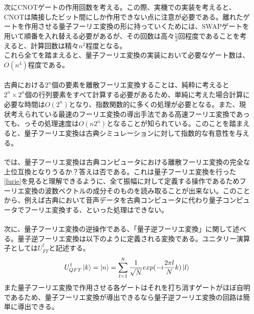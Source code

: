\documentclass[a4paper,10.5pt]{article}
\numberwithin{equation}{section}
\begin{document}
次にCNOTゲートの作用回数を考える。この際、実機での実装を考えると、CNOTは隣接したビット間にしか作用できない点に注意が必要である。離れたゲートを作用させる量子フーリエ変換の形に持っていくためには、SWAPゲートを用いて順番を入れ替える必要があるが、その回数は高々$\frac{n}{2}$回程度であることを考えると、計算回数は精々$n^{2}$程度となる。\\
これら全てを踏まえると、量子フーリエ変換の実装において必要なゲート数は、$O(n^{4})$程度である。\\
\\
古典における$2^{n}$個の要素を離散フーリエ変換することは、純粋に考えると$2^{n}\times2^{n}$個の行列要素をすべて計算する必要があるため、単純に考えた場合計算に必要な時間は$O(2^{n})$となり、指数関数的に多くの処理が必要となる。また、現状考えられている最速のフーリエ変換の導出手法である高速フーリエ変換であっても、っその処理速度は$O(n2^{n})$となることが知られている。このことを踏まえると、量子フーリエ変換は古典シミュレーションに対して指数的な有意性を与える。\\
\\
では、量子フーリエ変換は古典コンピュータにおける離散フーリエ変換の完全な上位互換となりうるか？答えは否である。これは量子フーリエ変換を行った\eqref{furie}を見ると理解できるように、全て振幅に対して定義する操作であるためフーリエ変換の波数ベクトルの成分そのものを読み取ることが出来ない。このことから、例えば古典において音声データを古典コンピュータに代わり量子コンピュータでフーリエ変換する、といった処理はできない。\\
\\
次に、量子フーリエ変換の逆操作である、「量子逆フーリエ変換」に関して述べる。量子逆フーリエ変換は以下のように定義される変換である。ユニタリー演算子としては$U_{FT}^{\dagger}$と記述する。
\begin{equation}\begin{split}
 U_{QFT}^{\dagger}\ket{k} = \ket{n} 
    =\sum_{l=1}^{N}\frac{1}{\sqrt{N}}exp(-i\frac{2\pi l}{N}k) \ket{l} \label{furie_two}
\end{split} \end{equation}
また量子フーリエ変換で作用させる各ゲートはそれを打ち消すゲートがほぼ自明であるため、量子フーリエ変換が導出できるなら量子逆フーリエ変換の回路は簡単に導出できる。\\
\end{document}
